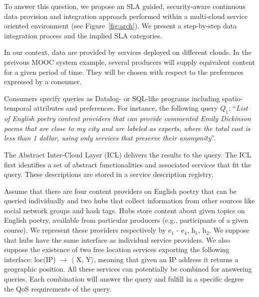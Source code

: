 To answer this question, we propose an SLA guided, security-aware continuous data provision and integration approach performed within a multi-cloud service oriented environment  (see
Figure~\ref{fig:arch}). 
We present a step-by-step data integration process and the implied  SLA categories.

In our context, data are provided by services deployed on different clouds. 
In the preivous   MOOC system example, several producers will supply equivalent content for a given period of time. 
They will be chosen with respect to the  preferences expressed by a consumer. 

Consumers  specify queries as Datalog- or SQL-like programs including spatio-temporal attributes and preferences.
For instance, the following query $Q_1$: ``\textit{List of English poetry content providers that can provide commented Emily Dickinson poems that are close to my city and are labeled as experts, where the total cost is less than 1 dollar, using only services that preserve their anonymity}''. 

The Abstract Inter-Cloud Layer (ICL) delivers the results to the  query. 
The ICL  first identifies a set of abstract functionalities  and associated services that fit the  query. These descriptions are stored in a service description registry.

Assume that there are four content providers on English poetry that can be queried individually and two hubs that collect information from other sources like social network groups and hash tags.
Hubs  store content about given topics on  English poetry, available from particular producers (e.g., participants of a given course).
We represent these providers respectively by { e$_1$ - e$_4$}, {h$_1$}, {h$_2$}. 
We suppose that hubs  have the same interface as individual service providers.
We also suppose the existence of two free location services exporting the following interface: {loc(IP) $\rightarrow$ $\langle$ X, Y$\rangle$}, meaning that given an IP address it returns a geographic position.
All these services can potentially be combined for answering queries. Each combination will answer the query and fulfill in a specific degree the QoS requirements of the query.




\begin{figure}
\end{figure}


